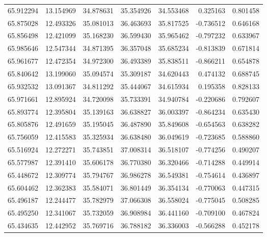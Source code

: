 \begin{tabular}{rrrrrrr}
 65.912294 &  13.154969 &         34.878631 &         35.354926 &         34.553468 &  0.325163 &  0.801458 \\
 65.875028 &  12.493326 &         35.081013 &         36.463693 &         35.817525 & -0.736512 &  0.646168 \\
 65.856498 &  12.421099 &         35.168230 &         36.599430 &         35.965462 & -0.797232 &  0.633967 \\
 65.985646 &  12.547344 &         34.871395 &         36.357048 &         35.685234 & -0.813839 &  0.671814 \\
 65.961677 &  12.472354 &         34.972300 &         36.493389 &         35.838511 & -0.866211 &  0.654878 \\
 65.840642 &  13.199060 &         35.094574 &         35.309187 &         34.620443 &  0.474132 &  0.688745 \\
 65.932532 &  13.091367 &         34.811292 &         35.444067 &         34.615934 &  0.195358 &  0.828133 \\
 65.971661 &  12.895924 &         34.720098 &         35.733391 &         34.940784 & -0.220686 &  0.792607 \\
 65.893774 &  12.395804 &         35.139163 &         36.638827 &         36.003397 & -0.864234 &  0.635430 \\
 65.805876 &  12.491659 &         35.195045 &         36.487890 &         35.849608 & -0.654563 &  0.638282 \\
 65.756059 &  12.415583 &         35.325934 &         36.638480 &         36.049619 & -0.723685 &  0.588860 \\
 65.516924 &  12.272271 &         35.743851 &         37.008314 &         36.518107 & -0.774256 &  0.490207 \\
 65.577987 &  12.391410 &         35.606178 &         36.770380 &         36.320466 & -0.714288 &  0.449914 \\
 65.448672 &  12.309774 &         35.794767 &         36.986278 &         36.549381 & -0.754614 &  0.436897 \\
 65.604462 &  12.362383 &         35.584071 &         36.801449 &         36.354134 & -0.770063 &  0.447315 \\
 65.496187 &  12.244477 &         35.782979 &         37.066308 &         36.558024 & -0.775045 &  0.508285 \\
 65.495250 &  12.341067 &         35.732059 &         36.908984 &         36.441160 & -0.709100 &  0.467824 \\
 65.434635 &  12.442952 &         35.769716 &         36.788182 &         36.336003 & -0.566288 &  0.452178 \\

\end{tabular}
